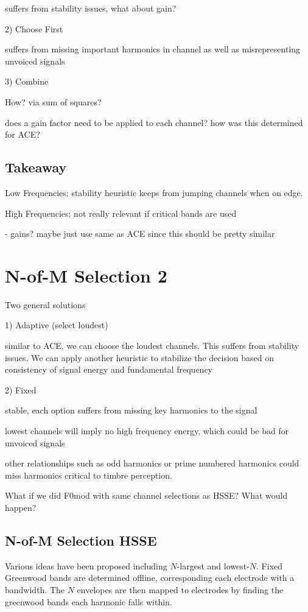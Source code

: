 \documentclass [11pt, proquest] {uwthesis}[2015/03/03]
\begin{document}
suffers from stability issues, what about gain?

2) Choose First

suffers from missing important harmonics in channel as well as misrepresenting unvoiced signals

3) Combine

How?  via sum of squares?

does a gain factor need to be applied to each channel?  how was this determined for ACE?

\subsection{Takeaway}

Low Frequencies: stability heuristic keeps from jumping channels when on edge.

High Frequencies: not really relevant if critical bands are used

- gains?  maybe just use same as ACE since this should be pretty similar
 

\section{N-of-M Selection 2}

Two general solutions

1) Adaptive (select loudest)

similar to ACE, we can choose the loudest channels.  This suffers from stability issues.  We can apply another heuristic to stabilize the decision based on consistency of signal energy and fundamental frequency

2) Fixed

stable, each option suffers from missing key harmonics to the signal

lowest channels will imply no high frequency energy, which could be bad for unvoiced signals

other relationships such as odd harmonics or prime numbered harmonics could miss harmonics critical to timbre perception.

What if we did F0mod with same channel selections as HSSE?  What would happen?

\subsection{N-of-M Selection HSSE}

Various ideas have been proposed including $N$-largest and lowest-$N$.  Fixed Greenwood bands are determined offline, corresponding each electrode with a bandwidth.  The $N$ envelopes are then mapped to electrodes by finding the greenwood bands each harmonic falls within.
\end{document}
